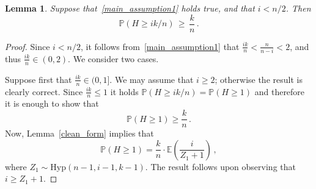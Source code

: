 \documentclass[10pt]{article}
\theoremstyle{plain}
\newtheorem{lemma}[theorem]{Lemma}
\theoremstyle{definition}
\theoremstyle{remark}
\begin{document}
\begin{lemma}\label{mms1}
Suppose that~\eqref{main_assumption1} holds true, and that  $i<n/2$.  
Then  
\[
\mathbb{P}(H \ge ik/n) \, \ge \, \frac{k}{n} \, .
\]
\end{lemma}
\begin{proof}
Since $i<n/2$, it follows from~\eqref{main_assumption1}  that $\frac{ik}{n} < \frac{n}{n-i} < 2$, and thus $\frac{ik}{n}\in (0,2)$. 
We consider two cases. 

Suppose first that $\frac{ik}{n} \in (0,1]$.  
We may assume that $i\ge 2$; otherwise the result is clearly correct. 
Since $\frac{ik}{n} \le 1$ it holds $\mathbb{P}(H \ge ik/n) =\mathbb{P}(H \ge 1)$ 
and therefore it is enough to show that
\[
\mathbb{P}(H\ge 1)\ge \frac{k}{n} \, .
\] 
Now, Lemma~\ref{clean_form} implies that 
\[
\mathbb{P}(H\ge 1)=\frac{k}{n} \cdot \mathbb{E}\left(\frac{i}{Z_1 + 1}\right)   \, , 
\]
where $Z_1\sim\text{Hyp}(n-1,i-1,k-1)$.   The result follows upon observing that $i\ge Z_1+1$. 


\end{proof}
\end{document}
